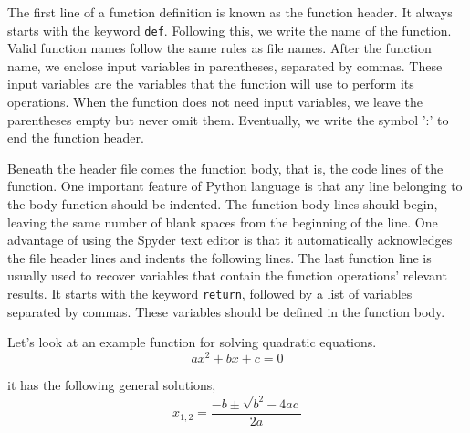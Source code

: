 \begin{paracol}{2}
The first line of a function definition is known as the function header. It always starts with the keyword \texttt{def}. Following this, we write the name of the function. Valid function names follow the same rules as file names. After the function name, we enclose input variables in parentheses, separated by commas. These input variables are the variables that the function will use to perform its operations. When the function does not need input variables, we leave the parentheses empty but never omit them. Eventually, we write the symbol ':' to end the function header.

Beneath the header file comes the function body, that is, the code lines of the function. One important feature of Python language is that any line belonging to the body function should be indented. The function body lines should begin, leaving the same number of blank spaces from the beginning of the line. One advantage of using the Spyder text editor is that it automatically acknowledges the file header lines and indents the following lines. The last function line is usually used to recover variables that contain the function operations' relevant results. It starts with the keyword \texttt{return}, followed by a list of variables separated by commas. These variables should be defined in the function body.

Let's look at an example function for solving quadratic equations.
\begin{equation*}
ax^2+bx+c=0
\end{equation*}

it has the following general solutions,
\begin{equation*}
    x_{1,2} = \frac{-b\pm \sqrt{b^2-4ac}}{2a}
\end{equation*}
\end{paracol}

